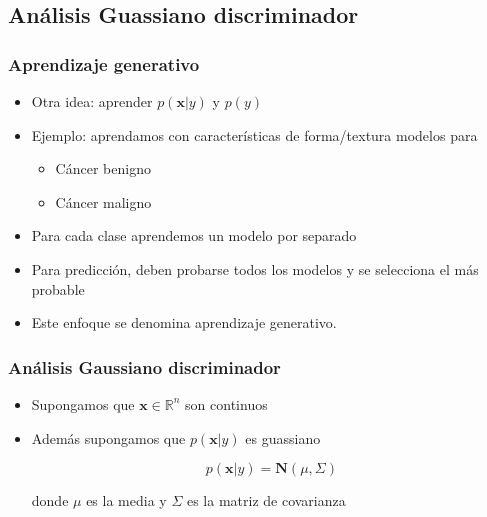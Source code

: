 \documentclass{beamer}
\begin{document}
\subsection{Análisis Guassiano discriminador}
\begin{frame}
\frametitle{Aprendizaje generativo}

\begin{itemize}
\item Otra idea: aprender $p(\boldsymbol{x}\vert y)$ y $p(y)$
\item Ejemplo: aprendamos con características de forma/textura modelos para 
\begin{itemize}
\item Cáncer benigno 
\item Cáncer maligno
\end{itemize}
\item Para cada clase aprendemos un modelo por separado
\item Para predicción, deben probarse todos los modelos y se selecciona el más probable
\item Este enfoque se denomina aprendizaje generativo. 
\end{itemize}
\end{frame}
\begin{frame}
\frametitle{Análisis Gaussiano discriminador}

\begin{itemize}

\item Supongamos que $\boldsymbol{x} \in \mathbb{R}^n$ son continuos
\item Además supongamos que $p(\boldsymbol{x}\vert y)$ es guassiano

\begin{equation*}
p(\boldsymbol{x}\vert y)= \mathbf{N} (\mu,\Sigma) 
\end{equation*}

donde $\mu$ es la media y $\Sigma$ es la matriz de covarianza 
\end{itemize}

\end{frame}
\end{document}
